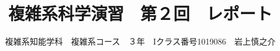 \documentclass[10pt, a4paper]{jsarticle}
\title{複雑系科学演習　第２回　レポート} %
\begin{document}
\author{複雑系知能学科　複雑系コース　３年　Iクラス番号1019086　岩上慎之介}
\maketitle %
\newpage




\end{document}
